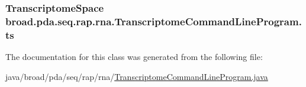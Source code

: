\hypertarget{classbroad_1_1pda_1_1seq_1_1rap_1_1rna_1_1_transcriptome_command_line_program_a90fbb65c49cbc69efff3cd247d8503ad}{
\subsubsection[{ts}]{\setlength{\rightskip}{0pt plus 5cm}Transcriptome\+Space broad.\+pda.\+seq.\+rap.\+rna.\+Transcriptome\+Command\+Line\+Program.\+ts\hspace{0.3cm}{\ttfamily [protected]}}}\label{classbroad_1_1pda_1_1seq_1_1rap_1_1rna_1_1_transcriptome_command_line_program_a90fbb65c49cbc69efff3cd247d8503ad}


The documentation for this class was generated from the following file\+:\begin{DoxyCompactItemize}
\item 
java/broad/pda/seq/rap/rna/\hyperlink{_transcriptome_command_line_program_8java}{Transcriptome\+Command\+Line\+Program.\+java}\end{DoxyCompactItemize}
